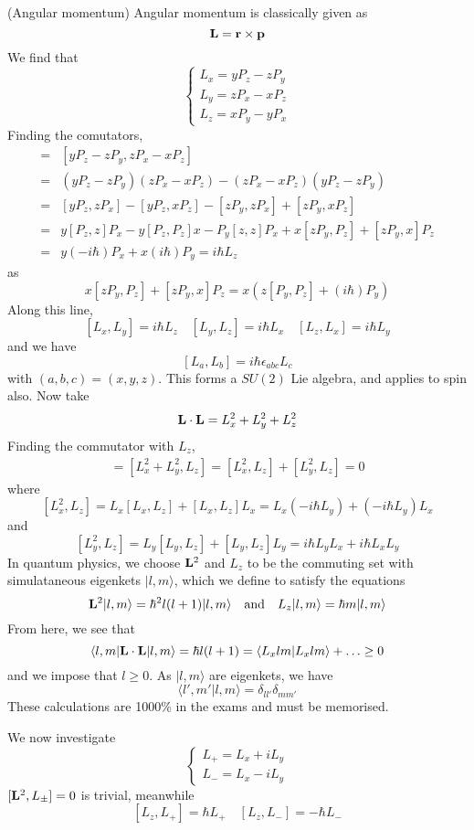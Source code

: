 \vspace{2ex}
\begin{defi}
(Angular momentum) Angular momentum is classically given as
\[{\bf L}={\bf r}\times {\bf p}\]
We find that
\[\begin{cases}
L_{x}=yP_{z}-zP_{y}\\
L_{y}=zP_{x}-xP_{z}\\
L_{z}=xP_{y}-yP_{x}
\end{cases}\]
Finding the comutators,
\begin{align*}
[L_{x},L_{y}]=&[yP_{z}-zP_{y},zP_{x}-xP_{z}]\\
=&(yP_{z}-zP_{y})(zP_{x}-xP_{z})-(zP_{x}-xP_{z})(yP_{z}-zP_{y})\\
=&[yP_{z},zP_{x}]-[yP_{z},xP_{z}]-[zP_{y},zP_{x}]+[zP_{y},xP_{z}]\\
=&y[P_{z},z]P_{x}-y[P_z,P_z]x-P_y[z,z]P_x+x[zP_y,P_z]+[zP_y,x]P_z\\
=&y(-i\hbar )P_x+x(i\hbar)P_y=i\hbar L_z
\end{align*}
as
\[x[zP_{y},P_{z}]+[zP_{y},x]P_{z}=x(z[P_{y},P_{z}]+(i\hbar )P_{y})\]
Along this line, 
\[[L_{x},L_{y}]=i\hbar L_{z}\quad [L_{y},L_{z}]=i\hbar L_{x}\quad [L_{z},L_{x}]=i\hbar L_{y}\]
and we have
\[[L_{a},L_{b}]=i\hbar \epsilon _{abc}L_{c}\]
with $(a,b,c)=(x,y,z)$. This forms a $SU(2)$ Lie algebra, and applies to spin also. Now take
\[{\bf L}\cdot {\bf L}=L_{x}^2+L_{y}^2+L_{z}^2\]
Finding the commutator with $L_{z}$,
\begin{align*}
[{\bf L}\cdot {\bf L},L_{z}]=[L_{x}^2+L_{y}^2,L_{z}]=[L_{x}^2,L_{z}]+[L_{y}^2,L_{z}]=0
\end{align*}
where
\[[L_{x}^2,L_{z}]=L_{x}[L_{x},L_{z}]+[L_{x},L_{z}]L_{x}=L_{x}(-i\hbar L_{y})+(-i\hbar L_{y})L_{x}\]
and 
\[[L_{y}^2,L_{z}]=L_{y}[L_{y},L_{z}]+[L_{y},L_{z}]L_{y}=i\hbar L_{y}L_{x}+i\hbar L_{x}L_{y}\]
In quantum physics, we choose ${\bf L}^2$ and $L_{z}$ to be the commuting set with simulataneous eigenkets $|l,m\rangle $, which we define to satisfy the equations
\[{\bf L}^2|l,m\rangle =\hbar^2 l(l+1)|l,m\rangle \quad \mathrm{and}\quad L_{z}|l,m\rangle =\hbar m|l,m\rangle \]
From here, we see that
\[\langle l,m|{\bf L}\cdot {\bf L}|l,m\rangle =\hbar l(l+1)=\langle L_{x}lm|L_{x}lm\rangle +\ldots \geq 0\]
and we impose that $l\geq 0$. As $|l,m\rangle $ are eigenkets, we have
\[\langle l',m'|l,m\rangle =\delta _{ll'}\delta _{mm'}\]
These calculations are 1000\% in the exams and must be memorised.
\end{defi}
\vspace{2ex}
\begin{rmk}
We now investigate
\[\begin{cases}
L_{+}=L_{x}+iL_{y}\\
L_{-}=L_{x}-iL_{y}
\end{cases}\]
$[{\bf L}^2,L_{\pm}]=0$ is trivial, meanwhile
\[[L_{z},L_{+}]=\hbar L_{+}\quad [L_{z},L_{-}]=-\hbar L_{-}\]
\end{rmk}
\vspace{2ex}

